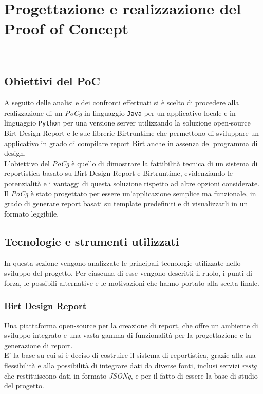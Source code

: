 \chapter{Progettazione e realizzazione del Proof of Concept}
\label{cap:progettazione-codifica}

\\

\section{Obiettivi del PoC}
A seguito delle analisi e dei confronti effettuati si è scelto di procedere alla realizzazione di un \emph{\gls{PoCg}} in linguaggio \texttt{Java} per un applicativo locale e in linguaggio \texttt{Python} per una versione server utilizzando la soluzione open-source Birt Design Report e le sue librerie Birtruntime che permettono di sviluppare un applicativo in grado di compilare report Birt anche in assenza del programma di design.\\
L'obiettivo del \emph{\gls{PoCg}} è quello di dimostrare la fattibilità tecnica di un sistema di reportistica basato su Birt Design Report e Birtruntime, evidenziando le potenzialità e i vantaggi di questa soluzione rispetto ad altre opzioni considerate.\\
Il \emph{\gls{PoCg}} è stato progettato per essere un'applicazione semplice ma funzionale, in grado di generare report basati su template predefiniti e di visualizzarli in un formato leggibile.\\

\section{Tecnologie e strumenti utilizzati}
\label{sec:tecnologie-strumenti-utilizzati}
In questa sezione vengono analizzate le principali tecnologie utilizzate nello sviluppo del progetto. Per ciascuna di esse vengono descritti il ruolo, i punti di forza, le possibili alternative e le motivazioni che hanno portato alla scelta finale.
    
    \subsection{Birt Design Report}
    \label{subsec:birt-design-report}
    Una piattaforma open-source per la creazione di report, che offre un ambiente di sviluppo integrato e una vasta gamma di funzionalità per la progettazione e la generazione di report.\\
    E' la base su cui si è deciso di costruire il sistema di reportistica, grazie alla sua flessibilità e alla possibilità di integrare dati da diverse fonti, inclusi servizi \emph{\gls{restg}} che restituiscono dati in formato \emph{\gls{JSONg}}, e per il fatto di essere la base di studio del progetto.\\
